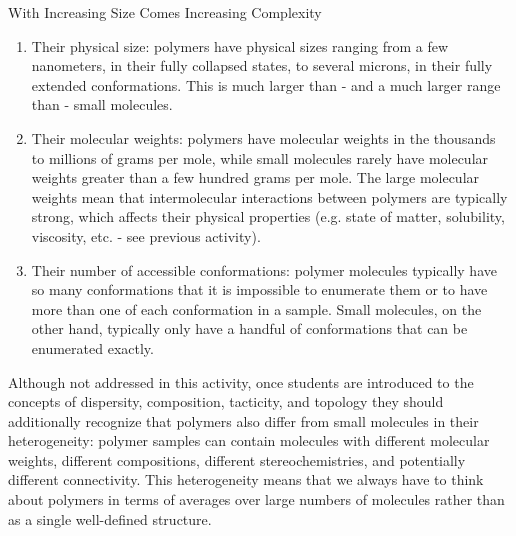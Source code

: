\begin{activity}{With Increasing Size Comes Increasing Complexity}
\begin{exercises}
\begin{solution}
{\begin{enumerate}
	\item Their physical size: polymers have physical sizes ranging from a few nanometers, in their fully collapsed states, to several microns, in their fully extended conformations.  This is much larger than - and a much larger range than - small molecules.
	\item Their molecular weights: polymers have molecular weights in the thousands to millions of grams per mole, while small molecules rarely have molecular weights greater than a few hundred grams per mole.  The large molecular weights mean that intermolecular interactions between polymers are typically strong, which affects their physical properties (e.g. state of matter, solubility, viscosity, etc. - see previous activity).
	\item Their number of accessible conformations: polymer molecules typically have so many conformations that it is impossible to enumerate them or to have more than one of each conformation in a sample.  Small molecules, on the other hand, typically only have a handful of conformations that can be enumerated exactly.
\end{enumerate}

Although not addressed in this activity, once students are introduced to the concepts of dispersity, composition, tacticity, and topology they should additionally recognize that polymers also differ from small molecules in their heterogeneity: polymer samples can contain molecules with different molecular weights, different compositions, different stereochemistries, and potentially different connectivity.  This heterogeneity means that we always have to think about polymers in terms of averages over large numbers of molecules rather than as a single well-defined structure.

		}\end{solution}
	
\end{exercises}



	


	
\end{activity}